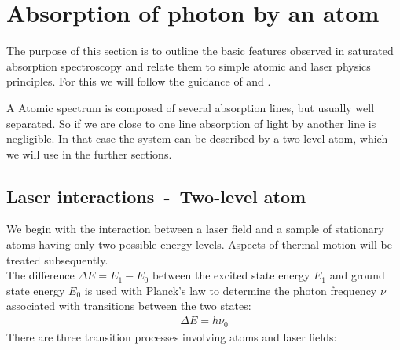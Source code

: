 
\ifpdf{}
\graphicspath{{Chapter2/Figs/Raster/}{Chapter2/Figs/PDF/}{Chapter2/Figs/}}
\else
\graphicspath{{Chapter2/Figs/Vector/}{Chapter2/Figs/}}
\fi

\chapter{Absorption of photon by an atom}  %
The purpose of this section is to outline the basic features observed in saturated absorption
spectroscopy and relate them to simple atomic and laser physics principles.
For this we will follow the guidance of \citep{SAS} and \citep{SAS_appendix}.

A Atomic spectrum is composed of several absorption lines, but usually well 
separated. So if we are close to one line absorption of light by another
line is negligible. In that case the system can be described by a two-level
atom, which we will use in the further sections.


\section{Laser interactions~-~Two-level atom} %

We begin with the interaction between a laser field and a sample of stationary atoms having
only two possible energy levels. Aspects of thermal motion will be treated subsequently.\\
The difference \(\Delta E = E_1 - E_0\) between the excited state  energy \(E_1\) and
ground state  energy \(E_0\) is used with Planck's law to determine the photon frequency
\(\nu \) associated with transitions between the two states:
\begin{align}
    \Delta E = h \nu_0
\end{align}
There are three transition processes involving atoms and laser fields:
\bigskip

